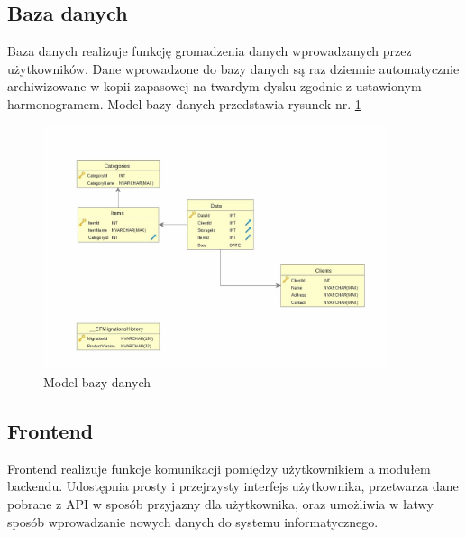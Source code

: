 \documentclass[12pt,a4paper]{article}
\begin{document}
		\subsection{Baza danych}
		\indent Baza danych realizuje funkcję gromadzenia danych wprowadzanych przez użytkowników. Dane wprowadzone do bazy danych są raz dziennie automatycznie archiwizowane
			w kopii zapasowej na twardym dysku zgodnie z ustawionym harmonogramem. Model bazy danych przedstawia rysunek nr. \ref{fig:db_model}\\
		\begin{figure}[H]
			\centering
			\includegraphics[width=0.9\textwidth]{img/model_bazy_danych.jpg}
			\caption{Model bazy danych}
		\label{fig:db_model}
		\end{figure}
		\subsection{Frontend}
		\indent Frontend realizuje funkcje komunikacji pomiędzy użytkownikiem a modułem backendu. Udostępnia prosty i przejrzysty interfejs użytkownika, przetwarza
			dane pobrane z API w sposób przyjazny dla użytkownika, oraz umożliwia w łatwy sposób wprowadzanie nowych danych do systemu informatycznego.\\	
\end{document}
